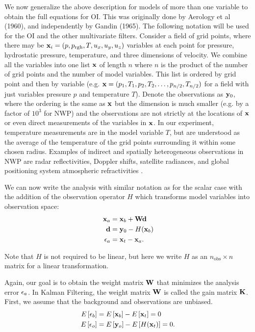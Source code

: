 \documentclass[12pt]{report}
\begin{document}
We now generalize the above description for models of more than one variable to obtain the full equations for OI.
This was originally done by Aerology et al (1960), and independently by Gandin (1965). 
The following notation will be used for the OI and the other multivariate filters.
Consider a field of grid points, where there may be $\mathbf{x}_i = (p,p_{\text{rgh}},T,u_x,u_y,u_z)$ variables at each point for pressure, hydrostatic pressure, temperature, and three dimensions of velocity.
We combine all the variables into one list $\mathbf{x}$ of length $n$ where $n$ is the product of the number of grid points and the number of model variables.
This list is ordered by grid point and then by variable (e.g. $\mathbf{x} = (p_1,T_1,p_2,T_2,\ldots,p_{n/2},T_{n/2})$ for a field with just variables pressure $p$ and temperature $T$).
Denote the observations as $\mathbf{y}_0$, where the ordering is the same as $\mathbf{x}$ but the dimension is much smaller (e.g. by a factor of $10^3$ for NWP) 
and the observations are not strictly at the locations of $\mathbf{x}$ or even direct measurements of the variables in $\mathbf{x}$.
In our experiment, temperature measurements are in the model variable $T$, but are understood as the average of the temperature of the grid points surrounding it within some chosen radius.
Examples of indirect and spatially heterogeneous observations in NWP are radar reflectivities, Doppler shifts, satellite radiances, and global positioning system atmospheric refractivities .

We can now write the analysis with similar notation as for the scalar case with the addition of the observation operator $H$ which transforms model variables into observation space:
\begin{align} \mathbf{x}_a &= \mathbf{x}_b + \mathbf{W} \mathbf{d} \\
\mathbf{d} &=  \mathbf{y}_0 - H (\mathbf{x} _b ) \\
\mathbf{\epsilon} _a  &= \mathbf{x}_t - \mathbf{x}_a . \end{align}

Note that $H$ is not required to be linear, but here we write $H$ as an $n_{\text{obs}} \times n$ matrix for a linear transformation.

Again, our goal is to obtain the weight matrix $\mathbf{W}$ that minimizes the analysis error $\mathbf{\epsilon}_a$. In Kalman Filtering, the weight matrix $\mathbf{W}$ is called the gain matrix $\mathbf{K}$.
First, we assume that the background and observations are unbiased.
\begin{align*} E \left [  \mathbf{\epsilon}_b \right ] &= E \left [  \mathbf{x} _b \right ] - E \left [ \mathbf{x} _t  \right ] = 0\\
E \left [  \mathbf{\epsilon}_o  \right ]  &= E \left [  \mathbf{y}_o  \right ] - E \left [  H(\mathbf{x}_t) \right ] = 0 .\end{align*}
\end{document}
